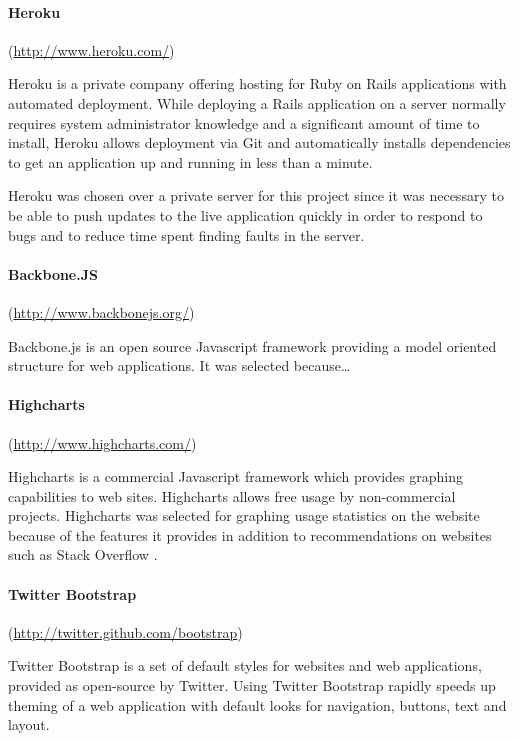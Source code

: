 
\paragraph{Heroku}
(\url{http://www.heroku.com/})

Heroku is a private company offering hosting for Ruby on Rails applications with automated deployment. While deploying
a Rails application on a server normally requires system administrator knowledge and a significant amount of
time to install, Heroku
allows deployment via Git and automatically installs dependencies to get an application up and running in less
than a minute.

Heroku was chosen over a private server for this project since it was necessary to be able to push updates
to the live application quickly in order to respond to bugs and to reduce time spent finding faults in the server.


\paragraph{Backbone.JS}
(\url{http://www.backbonejs.org/})

Backbone.js is an open source Javascript framework providing a model oriented structure for web applications.
It was selected because\ldots


\paragraph{Highcharts}
(\url{http://www.highcharts.com/})

Highcharts is a commercial Javascript framework which provides graphing capabilities to web sites. Highcharts
allows free usage by non-commercial projects. Highcharts was selected for graphing usage statistics
on the website because of the features it provides in addition to recommendations on websites such as Stack Overflow \cite{stackoverflow_highcharts_2012}.

\paragraph{Twitter Bootstrap}
(\url{http://twitter.github.com/bootstrap})

Twitter Bootstrap is a set of default styles for websites and web applications,
provided as open-source by Twitter. Using Twitter Bootstrap rapidly speeds up theming of
a web application with default looks for navigation, buttons, text and layout.


